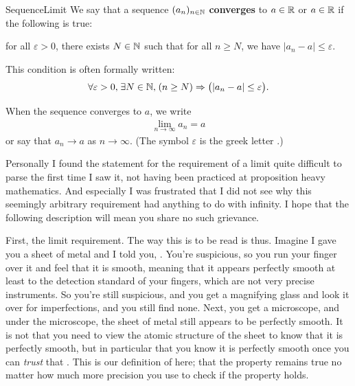 \documentclass[11pt]{article}
\begin{document}
\begin{label definition}{SequenceLimit}
We say that a sequence $(a_n)_{n \in \mathbb{N}}$ \textbf{converges} to $a \in \mathbb{R}$ or  $a \in \mathbb{R}$ if the following is true: 

for all $\varepsilon > 0$, there exists $N \in \mathbb{N}$ such that for all $n \ge N$, we have $|a_n - a| \le \varepsilon$.

This condition is often formally written: \begin{gather*}
\forall \varepsilon > 0, \hspace{0.1em} \exists N \in \mathbb{N}, \hspace{0.1em} (n \ge N) \Rightarrow \big(|a_n - a| \le \varepsilon \big).
\end{gather*}

When the sequence converges to $a$, we write \begin{gather*}
\lim_{n \to \infty} a_n = a
\end{gather*}
or say that $a_n \to a$ as $n \to \infty$. (The symbol $\varepsilon$ is the greek letter .)
\end{label definition}

Personally I found the statement for the requirement of a limit quite difficult to parse the first time I saw it, not having been practiced at proposition heavy mathematics. And especially I was frustrated that I did not see why this seemingly arbitrary requirement had anything to do with infinity. I hope that the following description will mean you share no such grievance.

First, the limit requirement. The way this is to be read is thus. Imagine I gave you a sheet of metal and I told you, . You're suspicious, so you run your finger over it and feel that it is smooth, meaning that it appears perfectly smooth at least to the detection standard of your fingers, which are not very precise instruments. So you're still suspicious, and you get a magnifying glass and look it over for imperfections, and you still find none. Next, you get a microscope, and under the microscope, the sheet of metal still appears to be perfectly smooth. It is not that you need to view the atomic structure of the sheet to know that it is perfectly smooth, but in particular that you know it is perfectly smooth once you can \emph{trust} that . This is our definition of  here; that the property remains true no matter how much more precision you use to check if the property holds.
\end{document}
